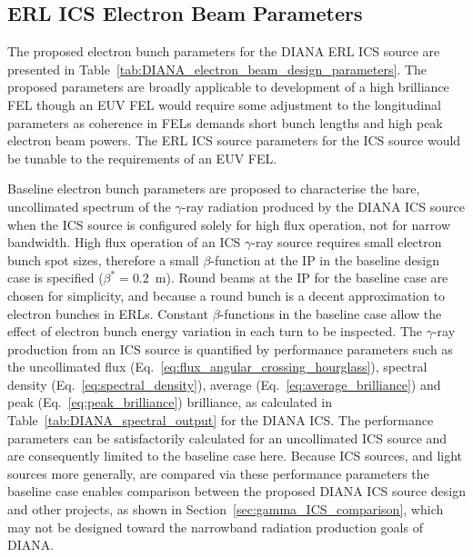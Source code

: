 \documentclass[../main.tex]{subfiles}
\begin{document}
\subsection{ERL ICS Electron Beam Parameters }
\label{sec:DIANA_electron_parameters}

The proposed electron bunch parameters for the DIANA ERL ICS source are presented in Table~\ref{tab:DIANA_electron_beam_design_parameters}. The proposed parameters are broadly applicable to development of a high brilliance FEL though an EUV FEL would require some adjustment to the longitudinal parameters as coherence in FELs demands short bunch lengths and high peak electron beam powers. The ERL ICS source parameters for the ICS source would be tunable to the requirements of an EUV FEL. 

Baseline electron bunch parameters are proposed to characterise the bare, uncollimated spectrum of the $\gamma$-ray radiation produced by the DIANA ICS source when the ICS source is configured solely for high flux operation, not for narrow bandwidth. High flux operation of an ICS $\gamma$-ray source requires small electron bunch spot sizes, therefore a small $\beta$-function at the IP in the baseline design case is specified ($\beta^{*}=0.2$~\si{\meter}). Round beams at the IP for the baseline case are chosen for simplicity, and because a round bunch is a decent approximation to electron bunches in ERLs. Constant $\beta$-functions in the baseline case allow the effect of electron bunch energy variation in each turn to be inspected. The $\gamma$-ray production from an ICS source is quantified by performance parameters such as the uncollimated flux (Eq.~\ref{eq:flux_angular_crossing_hourglass}), spectral density (Eq.~\ref{eq:spectral_density}), average (Eq.~\ref{eq:average_brilliance}) and peak (Eq.~\ref{eq:peak_brilliance}) brilliance, as calculated in Table~\ref{tab:DIANA_spectral_output} for the DIANA ICS. The performance parameters can be satisfactorily calculated for an uncollimated ICS source and are consequently limited to the baseline case here. Because ICS sources, and light sources more generally, are compared via these performance parameters the baseline case enables comparison between the proposed DIANA ICS source design and other projects, as shown in Section~\ref{sec:gamma_ICS_comparison}, which may not be designed toward the narrowband radiation production goals of DIANA.
\end{document}
